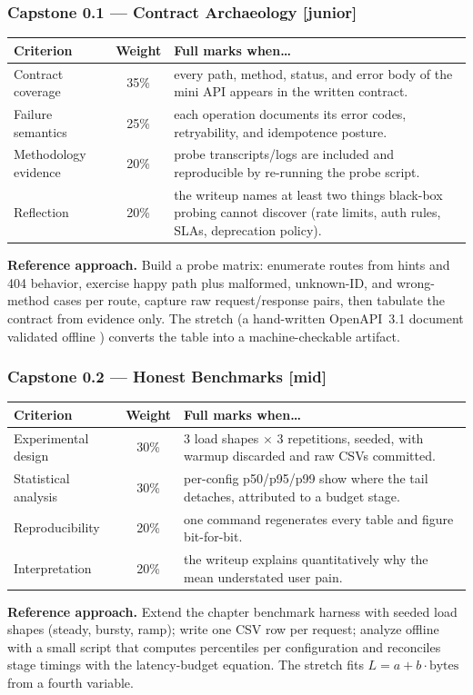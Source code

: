\subsubsection*{Capstone 0.1 --- Contract Archaeology [junior]}
\begin{center}\small
\begin{tabularx}{\textwidth}{l c X}
\toprule
\textbf{Criterion} & \textbf{Weight} & \textbf{Full marks when\ldots} \\
\midrule
Contract coverage & 35\% & every path, method, status, and error body of the mini API appears in the written contract. \\
Failure semantics & 25\% & each operation documents its error codes, retryability, and idempotence posture. \\
Methodology evidence & 20\% & probe transcripts/logs are included and reproducible by re-running the probe script. \\
Reflection & 20\% & the writeup names at least two things black-box probing cannot discover (rate limits, auth rules, SLAs, deprecation policy). \\
\bottomrule
\end{tabularx}
\end{center}
\textbf{Reference approach.} Build a probe matrix: enumerate routes from
hints and 404 behavior, exercise happy path plus malformed, unknown-ID, and
wrong-method cases per route, capture raw request/response pairs, then
tabulate the contract from evidence only. The stretch (a hand-written
OpenAPI~3.1 document validated offline \cite{openapi31}) converts the table
into a machine-checkable artifact.

\subsubsection*{Capstone 0.2 --- Honest Benchmarks [mid]}
\begin{center}\small
\begin{tabularx}{\textwidth}{l c X}
\toprule
\textbf{Criterion} & \textbf{Weight} & \textbf{Full marks when\ldots} \\
\midrule
Experimental design & 30\% & 3 load shapes $\times$ 3 repetitions, seeded, with warmup discarded and raw CSVs committed. \\
Statistical analysis & 30\% & per-config p50/p95/p99 show where the tail detaches, attributed to a budget stage. \\
Reproducibility & 20\% & one command regenerates every table and figure bit-for-bit. \\
Interpretation & 20\% & the writeup explains quantitatively why the mean understated user pain. \\
\bottomrule
\end{tabularx}
\end{center}
\textbf{Reference approach.} Extend the chapter benchmark harness with
seeded load shapes (steady, bursty, ramp); write one CSV row per request;
analyze offline with a small script that computes percentiles per
configuration and reconciles stage timings with the latency-budget equation.
The stretch fits $L = a + b\cdot\text{bytes}$ from a fourth variable.

